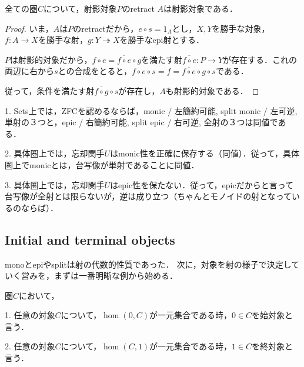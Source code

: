\documentclass[uplatex, dvipdfmx]{jsarticle}
\begin{document}
\begin{proposition*}[射影性の引き戻し]
    全ての圏$C$について，射影対象$P$のretract $A$は射影対象である．
\end{proposition*}
\begin{proof}
    いま，$A$は$P$のretractだから，$e\circ s=1_A$とし，$X,Y$を勝手な対象，$f:A\to X$を勝手な射，$g:Y\twoheadrightarrow X$を勝手なepi射とする．
    \begin{center}
    \end{center}
    $P$は射影的対象だから，$f\circ e=\overline{f\circ e}\circ g$を満たす射$\overline{f\circ e}:P\to Y$が存在する．これの両辺に右から$s$との合成をとると，$f\circ e\circ s=f=\overline{f\circ e}\circ g\circ s$である．
    
    従って，条件を満たす射$\overline{f\circ g}\circ s$が存在し，$A$も射影的対象である．
\end{proof}

\begin{screen}
    1. Sets上では，ZFCを認めるならば，monic / 左簡約可能, split monic / 左可逆, 単射の３つと，epic / 右簡約可能, split epic / 右可逆, 全射の３つは同値である．

    2. 具体圏上では，忘却関手$U$はmonic性を正確に保存する（同値）．従って，具体圏上でmonicとは，台写像が単射であることに同値．

    3. 具体圏上では，忘却関手$U$はepic性を保たない．従って，epicだからと言って台写像が全射とは限らないが，逆は成り立つ（ちゃんとモノイドの射となっているのならば）．
\end{screen}

\subsection{Initial and terminal objects}

monoとepiやsplitは射の代数的性質であった．
次に，対象を射の様子で決定していく営みを，まずは一番明晰な例から始める．

\begin{definition}
    圏$C$において，

    1. 任意の対象$C$について，$\hom(0,C)$が一元集合である時，$0\in C$を始対象と言う．

    2. 任意の対象$C$について，$\hom(C,1)$が一元集合である時，$1\in C$を終対象と言う．
\end{definition}
\end{document}
